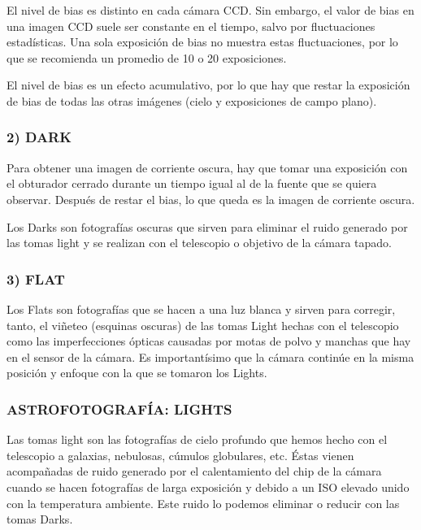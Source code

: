 \documentclass{article}
\begin{document}
El nivel de bias es distinto en cada cámara CCD. Sin embargo, el valor de bias en una imagen CCD suele ser constante en el tiempo, salvo por fluctuaciones estadísticas. Una sola exposición de bias no muestra estas fluctuaciones, por lo que se recomienda un promedio de 10 o 20 exposiciones.

El nivel de bias es un efecto acumulativo, por lo que hay que restar la exposición de bias de todas las otras imágenes (cielo y exposiciones de campo plano).

\subsubsection{2) DARK}
Para obtener una imagen de corriente oscura, hay que tomar una exposición con el obturador cerrado durante un tiempo igual al de la fuente que se quiera observar. Después de restar el bias, lo que queda es la imagen de corriente oscura.

Los Darks son fotografías oscuras que sirven para eliminar el ruido generado por las tomas light y se realizan con el telescopio o objetivo de la cámara tapado.

\subsubsection{3) FLAT}
Los Flats son fotografías que se hacen a una luz blanca y sirven para corregir, tanto, el viñeteo (esquinas oscuras) de las tomas Light hechas con el telescopio como las imperfecciones ópticas causadas por motas de polvo y manchas que hay en el sensor de la cámara. Es importantísimo que la cámara continúe en la misma posición y enfoque con la que se tomaron los Lights.

\subsubsection{ASTROFOTOGRAFÍA: LIGHTS}
Las tomas light son las fotografías de cielo profundo que hemos hecho con el telescopio a galaxias, nebulosas, cúmulos globulares, etc. Éstas vienen acompañadas de ruido generado por el calentamiento del chip de la cámara cuando se hacen fotografías de larga exposición y debido a un ISO elevado unido con la temperatura ambiente. Este ruido lo podemos eliminar o reducir con las tomas Darks.
\end{document}
